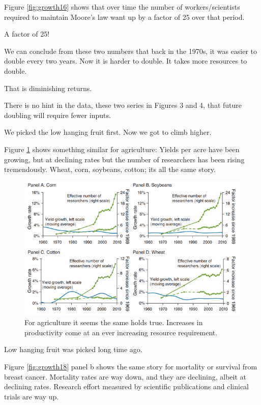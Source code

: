 \documentclass[
]{book}
\begin{document}
Figure \ref{fig:growth16} shows that over time the number of workers/scientists required to maintain Moore's law want up by a factor of 25 over that period.

A factor of 25!

We can conclude from these two numbers that back in the 1970s, it was easier to double every two years. Now it is harder to double. It takes more resources to double.

That is diminishing returns.

There is no hint in the data, these two series in Figures 3 and 4, that future doubling will require fewer inputs.

We picked the low hanging fruit first. Now we got to climb higher.

Figure \ref{fig:growth17} shows something similar for agriculture: Yields per acre have been growing, but at declining rates but the number of researchers has been rising tremendously. Wheat, corn, soybeans, cotton; its all the same story.

\begin{figure}

{\centering \includegraphics[width=1\linewidth]{img/growth/moore17} 

}

\caption{For agriculture it seems the same holds true. Increases in productivity come at an ever increasing resource requirement.}\label{fig:growth17}
\end{figure}

Low hanging fruit was picked long time ago.

Figure \ref{fig:growth18} panel b shows the same story for mortality or survival from breast cancer. Mortality rates are way down, and they are declining, albeit at declining rates. Research effort measured by scientific publications and clinical trials are way up.
\end{document}
